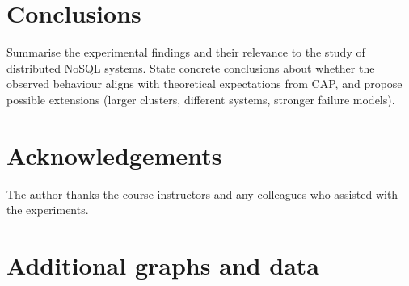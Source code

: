 \documentclass{article}
\begin{document}
\section{Conclusions}
Summarise the experimental findings and their relevance to the study of distributed NoSQL systems. State concrete conclusions about whether the observed behaviour aligns with theoretical expectations from CAP, and propose possible extensions (larger clusters, different systems, stronger failure models).

\section*{Acknowledgements}
The author thanks the course instructors and any colleagues who assisted with the experiments. 


\newpage
{}



\newpage
\appendix
\section{Additional graphs and data}
\end{document}
